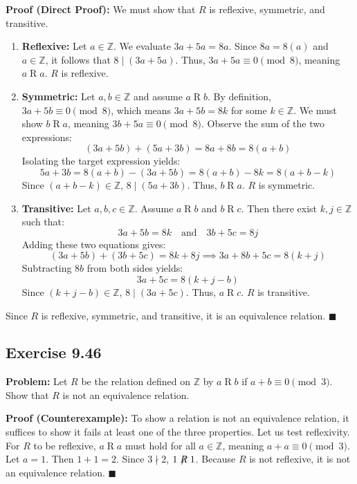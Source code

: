 \documentclass[11pt, a4paper]{article}
\theoremstyle{definition}
\theoremstyle{remark}
\begin{document}
\textbf{Proof (Direct Proof):}
We must show that $R$ is reflexive, symmetric, and transitive.
\begin{enumerate}
    \item \textbf{Reflexive:} Let $a \in \mathbb{Z}$. We evaluate $3a + 5a = 8a$. Since $8a = 8(a)$ and $a \in \mathbb{Z}$, it follows that $8 \mid (3a + 5a)$. Thus, $3a + 5a \equiv 0 \pmod{8}$, meaning $a \mathrel{R} a$. $R$ is reflexive.
    \item \textbf{Symmetric:} Let $a, b \in \mathbb{Z}$ and assume $a \mathrel{R} b$. By definition, $3a + 5b \equiv 0 \pmod{8}$, which means $3a + 5b = 8k$ for some $k \in \mathbb{Z}$. We must show $b \mathrel{R} a$, meaning $3b + 5a \equiv 0 \pmod{8}$. 
    Observe the sum of the two expressions:
    \[ \displaystyle (3a + 5b) + (5a + 3b) = 8a + 8b = 8(a + b) \]
    Isolating the target expression yields:
    \[ \displaystyle 5a + 3b = 8(a + b) - (3a + 5b) = 8(a + b) - 8k = 8(a + b - k) \]
    Since $(a + b - k) \in \mathbb{Z}$, $8 \mid (5a + 3b)$. Thus, $b \mathrel{R} a$. $R$ is symmetric.
    \item \textbf{Transitive:} Let $a, b, c \in \mathbb{Z}$. Assume $a \mathrel{R} b$ and $b \mathrel{R} c$. Then there exist $k, j \in \mathbb{Z}$ such that:
    \[ \displaystyle 3a + 5b = 8k \quad \text{and} \quad 3b + 5c = 8j \]
    Adding these two equations gives:
    \[ \displaystyle (3a + 5b) + (3b + 5c) = 8k + 8j \implies 3a + 8b + 5c = 8(k + j) \]
    Subtracting $8b$ from both sides yields:
    \[ \displaystyle 3a + 5c = 8(k + j - b) \]
    Since $(k + j - b) \in \mathbb{Z}$, $8 \mid (3a + 5c)$. Thus, $a \mathrel{R} c$. $R$ is transitive.
\end{enumerate}
Since $R$ is reflexive, symmetric, and transitive, it is an equivalence relation. $\blacksquare$

\subsection*{Exercise 9.46}
\textbf{Problem:} Let $R$ be the relation defined on $\mathbb{Z}$ by $a \mathrel{R} b$ if $a + b \equiv 0 \pmod{3}$. Show that $R$ is not an equivalence relation.

\textbf{Proof (Counterexample):}
To show a relation is not an equivalence relation, it suffices to show it fails at least one of the three properties. Let us test reflexivity. For $R$ to be reflexive, $a \mathrel{R} a$ must hold for all $a \in \mathbb{Z}$, meaning $a + a \equiv 0 \pmod{3}$. 
Let $a = 1$. Then $1 + 1 = 2$. Since $3 \nmid 2$, $1 \not\mathrel{R} 1$. 
Because $R$ is not reflexive, it is not an equivalence relation. $\blacksquare$
\end{document}
